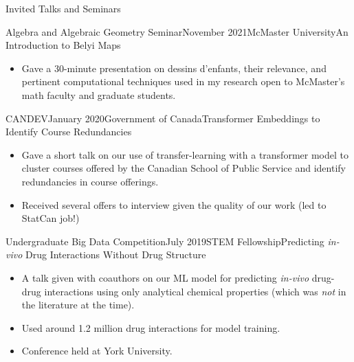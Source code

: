 \begin{rSection}{Invited Talks and Seminars}

\begin{rSubsection}{Algebra and Algebraic Geometry Seminar}{November 2021}{McMaster University}{An Introduction to Belyi Maps}
    \begin{itemize}
      \addtolength\itemsep{-0.5em}
      \item Gave a 30-minute presentation on dessins d'enfants, their relevance, and pertinent computational techniques used in my research open to McMaster's math faculty and graduate students.
    \end{itemize}
\end{rSubsection}
\smallskip

\begin{rSubsection}{CANDEV}{January 2020}{Government of Canada}{Transformer Embeddings to  Identify Course Redundancies}
    \begin{itemize}
      \addtolength\itemsep{-0.5em}
      \item Gave a short talk on our use of transfer-learning with a transformer model to cluster courses offered by the Canadian School of Public Service and identify redundancies in course offerings.
      \item Received several offers to interview given the quality of our work (led to StatCan job!)
    \end{itemize}
\end{rSubsection}
\smallskip

\begin{rSubsection}{Undergraduate Big Data Competition}{July 2019}{STEM Fellowship}{Predicting \textit{in-vivo} Drug Interactions Without Drug Structure}
	\begin{itemize}
      \addtolength\itemsep{-0.5em}
      \item A talk given with coauthors on our ML model for predicting \textit{in-vivo} drug-drug interactions using only analytical chemical properties (which was \emph{not} in the literature at the time).
      \item Used around 1.2 million drug interactions for model training.
      \item Conference held at York University.
    \end{itemize}
\end{rSubsection}




\end{rSection}
